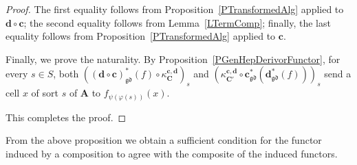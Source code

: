 \documentclass[a4paper, reqno
]{amsart}
\newcommand{\gd}{\mathfrak{gd}}              %
\theoremstyle{plain}
\theoremstyle{definition}
\begin{document}
\begin{proof}
The first equality follows from Proposition~\ref{PTransformedAlg} applied to $\mathbf{d}\circ\mathbf{c}$; the second equality follows from Lemma~\ref{LTermComp}; finally, the last equality follows from Proposition~\ref{PTransformedAlg} applied to $\mathbf{c}$.

Finally, we prove the naturality.
By Proposition~\ref{PGenHepDerivorFunctor}, for every $s\in S$, both $((\mathbf{d}\circ\mathbf{c})^{\ast}_{\gd}(f)\circ\kappa^{\mathbf{c},\mathbf{d}}_{\mathbf{C}})_{s}$ and $(\kappa^{\mathbf{c},\mathbf{d}}_{\mathbf{C}'}\circ\mathbf{c}^{\ast}_{\gd}(\mathbf{d}^{\ast}_{\gd}(f)))_{s}$ send a cell $x$ of sort $s$ of $\mathbf{A}$ to $f_{\psi(\varphi(s))}(x)$.

This completes the proof.
\end{proof}

From the above proposition we obtain a sufficient condition for the functor induced by a composition to agree with the composite of the induced functors.
\end{document}
